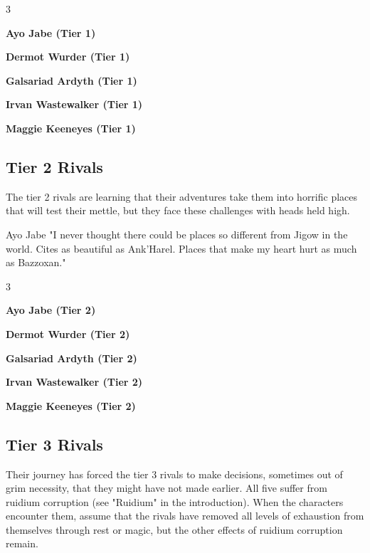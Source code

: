 \documentclass[10pt,a4paper,twoside,fancy,bg=print,twocolumn,openany,nodeprecatedcode]{dndbook}
\begin{document}
\begin{itemize}
\begin{multicols}{3}
\item \textbf{Ayo Jabe (Tier 1)}
\item \textbf{Dermot Wurder (Tier 1)}
\item \textbf{Galsariad Ardyth (Tier 1)}
\item \textbf{Irvan Wastewalker (Tier 1)}
\item \textbf{Maggie Keeneyes (Tier 1)}
\end{multicols}

\end{itemize}

\subsection{Tier 2 Rivals}
The tier 2 rivals are learning that their adventures take them into horrific places that will test their mettle, but they face these challenges with heads held high.

\begin{DndReadAloud}{Ayo Jabe}
"I never thought there could be places so different from Jigow in the world. Cites as beautiful as Ank'Harel. Places that make my heart hurt as much as Bazzoxan."

\end{DndReadAloud}


\begin{itemize}
\begin{multicols}{3}
\item \textbf{Ayo Jabe (Tier 2)}
\item \textbf{Dermot Wurder (Tier 2)}
\item \textbf{Galsariad Ardyth (Tier 2)}
\item \textbf{Irvan Wastewalker (Tier 2)}
\item \textbf{Maggie Keeneyes (Tier 2)}
\end{multicols}

\end{itemize}

\subsection{Tier 3 Rivals}
Their journey has forced the tier 3 rivals to make decisions, sometimes out of grim necessity, that they might have not made earlier. All five suffer from ruidium corruption (see "Ruidium" in the introduction). When the characters encounter them, assume that the rivals have removed all levels of exhaustion from themselves through rest or magic, but the other effects of ruidium corruption remain.
\end{document}
